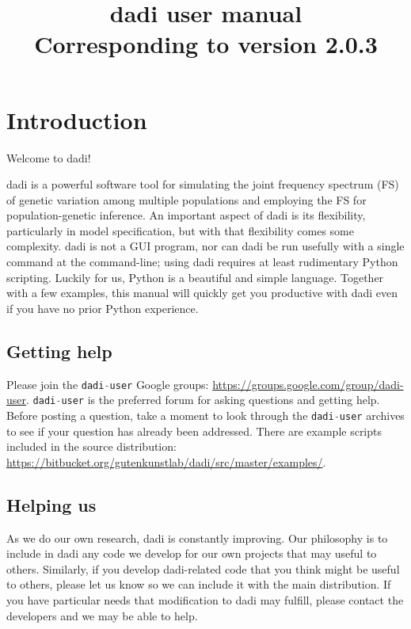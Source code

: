 \documentclass[12pt]{article}
\makeatletter
\newcommand{\dadi}{dadi\xspace}
\newcommand{\py}[1]{\lstinline[language=Python, showstringspaces=False]@#1@}
\makeatother
\begin{document}
\title{\dadi user manual\\\normalsize  Corresponding to version 2.0.3}
\date{}
\maketitle

\tableofcontents

\clearpage

\renewcommand*{\lstlistlistingname}{Example code}
\lstlistoflistings

\clearpage

\section{Introduction}

Welcome to \dadi!

\dadi is a powerful software tool for simulating the joint frequency spectrum (FS) of genetic variation among multiple populations and employing the FS for population-genetic inference.
An important aspect of \dadi is its flexibility, particularly in model specification, but with that flexibility comes some complexity.
\dadi is not a GUI program, nor can \dadi be run usefully with a single command at the command-line; using \dadi requires at least rudimentary Python scripting.
Luckily for us, Python is a beautiful and simple language.
Together with a few examples, this manual will quickly get you productive with \dadi even if you have no prior Python experience.

\subsection{Getting help}

Please join the \py{dadi-user} Google groups: \url{https://groups.google.com/group/dadi-user}.
\py{dadi-user} is the preferred forum for asking questions and getting help.
Before posting a question, take a moment to look through the \py{dadi-user} archives to see if your question has already been addressed.
There are example scripts included in the source distribution: \url{https://bitbucket.org/gutenkunstlab/dadi/src/master/examples/}.

\subsection{Helping us}

As we do our own research, \dadi is constantly improving.
Our philosophy is to include in \dadi any code we develop for our own projects that may useful to others.
Similarly, if you develop \dadi-related code that you think might be useful to others, please let us know so we can include it with the main distribution.
If you have particular needs that modification to \dadi may fulfill, please contact the developers and we may be able to help.
\end{document}
